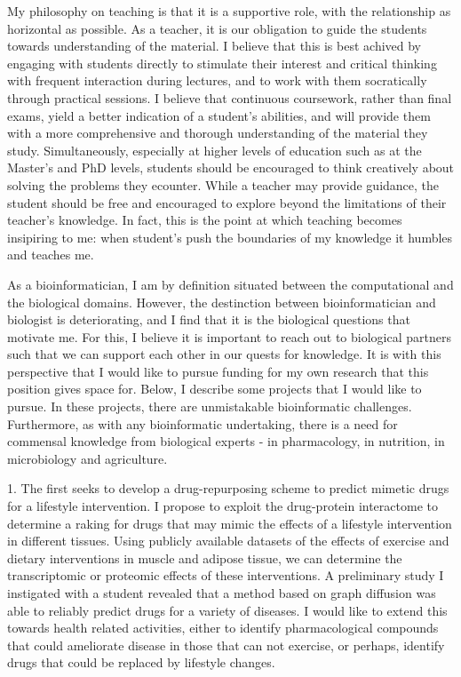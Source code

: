 \documentclass[letterpaper, 10pt]{article} %
\begin{document}
\begin{tcolorbox}[
	blanker,
	width=0.95\textwidth,
	enlarge left by=0.025\textwidth,
	enlarge right by=0.025\textwidth,
	before skip=6pt,
	breakable]
My philosophy on teaching is that it is a supportive role, with the relationship as horizontal as possible. As a teacher, it is our obligation to guide the students towards understanding of the material. I believe that this is best achived by engaging with students directly to stimulate their interest and critical thinking with frequent interaction during lectures, and to work with them socratically through practical sessions. I believe that continuous coursework, rather than final exams, yield a better indication of a student's abilities, and will provide them with a more comprehensive and thorough understanding of the material they study. Simultaneously, especially at higher levels of education such as at the Master’s and PhD levels, students should be encouraged to think creatively about solving the problems they ecounter. While a teacher may provide guidance, the student should be free and encouraged to explore beyond the limitations of their teacher's knowledge. In fact, this is the point at which teaching becomes insipiring to me: when student’s push the boundaries of my knowledge it humbles and teaches me.

As a bioinformatician, I am by definition situated between the computational and the biological domains. However, the destinction between bioinformatician and biologist is deteriorating, and I find that it is the biological questions that motivate me. For this, I believe it is important to reach out to biological partners such that we can support each other in our quests for knowledge. It is with this perspective that I would like to pursue funding for my own research that this position gives space for. Below, I describe some projects that I would like to pursue. In these projects, there are unmistakable bioinformatic challenges. Furthermore, as with any bioinformatic undertaking, there is a need for commensal knowledge from biological experts - in pharmacology, in nutrition, in microbiology and agriculture.

1. The first seeks to develop a drug-repurposing scheme to predict mimetic drugs for a lifestyle intervention. I propose to exploit the drug-protein interactome to determine a raking for drugs that may mimic the effects of a lifestyle intervention in different tissues. Using publicly available datasets of the effects of exercise and dietary interventions in muscle and adipose tissue, we can determine the transcriptomic or proteomic effects of these interventions. A preliminary study I instigated with a student revealed that a method based on graph diffusion was able to reliably predict drugs for a variety of diseases. I would like to extend this towards health related activities, either to identify pharmacological compounds that could ameliorate disease in those that can not exercise, or perhaps, identify drugs that could be replaced by lifestyle changes.


\end{tcolorbox}
\end{document}
